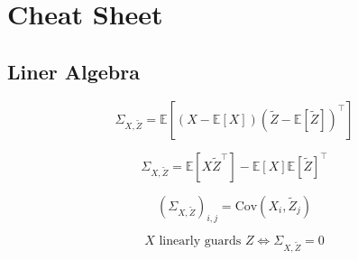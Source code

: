 \section{Cheat Sheet}

\subsection{Liner Algebra}


$$\Sigma_{X,\tilde{Z}} = \mathbb{E}\left[(X - \mathbb{E}[X])(\tilde{Z} - \mathbb{E}[\tilde{Z}])^\top\right]$$

$$\Sigma_{X,\tilde{Z}} = \mathbb{E}[X\tilde{Z}^\top] - \mathbb{E}[X]\mathbb{E}[\tilde{Z}]^\top$$

$$(\Sigma_{X,\tilde{Z}})_{i,j} = \text{Cov}(X_i, \tilde{Z}_j)$$

$$X \text{ linearly guards } Z \iff \Sigma_{X,\tilde{Z}} = 0$$
